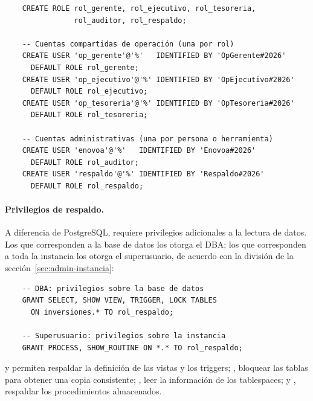 \begin{verbatim}
	CREATE ROLE rol_gerente, rol_ejecutivo, rol_tesoreria,
	            rol_auditor, rol_respaldo;

	-- Cuentas compartidas de operación (una por rol)
	CREATE USER 'op_gerente'@'%'   IDENTIFIED BY 'OpGerente#2026'
	  DEFAULT ROLE rol_gerente;
	CREATE USER 'op_ejecutivo'@'%' IDENTIFIED BY 'OpEjecutivo#2026'
	  DEFAULT ROLE rol_ejecutivo;
	CREATE USER 'op_tesoreria'@'%' IDENTIFIED BY 'OpTesoreria#2026'
	  DEFAULT ROLE rol_tesoreria;

	-- Cuentas administrativas (una por persona o herramienta)
	CREATE USER 'enovoa'@'%'   IDENTIFIED BY 'Enovoa#2026'
	  DEFAULT ROLE rol_auditor;
	CREATE USER 'respaldo'@'%' IDENTIFIED BY 'Respaldo#2026'
	  DEFAULT ROLE rol_respaldo;
\end{verbatim}

\paragraph{Privilegios de respaldo.} A diferencia de PostgreSQL,  requiere privilegios adicionales a la lectura de datos. Los que corresponden a la base de datos los otorga el DBA; los que corresponden a toda la instancia los otorga el superusuario, de acuerdo con la división de la sección~\ref{sec:admin-instancia}:

\begin{verbatim}
	-- DBA: privilegios sobre la base de datos
	GRANT SELECT, SHOW VIEW, TRIGGER, LOCK TABLES
	  ON inversiones.* TO rol_respaldo;

	-- Superusuario: privilegios sobre la instancia
	GRANT PROCESS, SHOW_ROUTINE ON *.* TO rol_respaldo;
\end{verbatim}

 y  permiten respaldar la definición de las vistas y los triggers; , bloquear las tablas para obtener una copia consistente; , leer la información de los tablespaces; y , respaldar los procedimientos almacenados.
